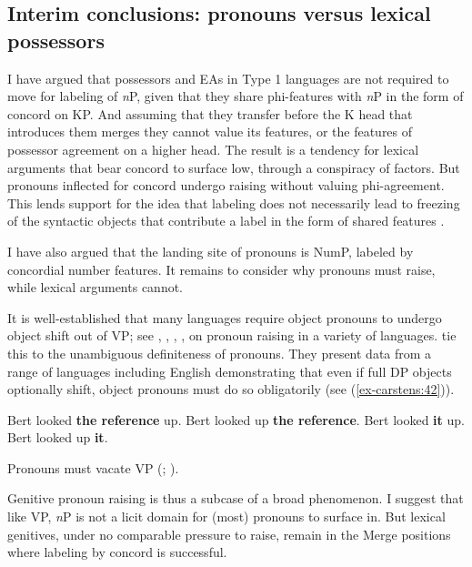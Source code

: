 \documentclass[output=paper
,modfonts
,nonflat]{langsci/langscibook}
\begin{document}
\subsection{Interim conclusions: pronouns versus lexical possessors} \label{sec-carstens:5.4}
I have argued that possessors and EAs in Type 1 languages are not required to move for labeling of \textit{n}P, given that they share phi-features with \textit{n}P in the form of concord on KP. And assuming that they transfer before the K head that introduces them merges they cannot value its features, or the features of possessor agreement on a higher head. The result is a tendency for lexical arguments that bear concord to surface low, through a conspiracy of factors. But pronouns inflected for concord undergo raising without valuing phi-agreement. This lends support for the idea that labeling does not necessarily lead to freezing of the syntactic objects that contribute a label in the form of shared features \citep{Chomsky2015}. 

I have also argued that the landing site of pronouns is NumP, labeled by concordial number features. It remains to consider why pronouns must raise, while lexical arguments cannot. 

It is well-established that many languages require object pronouns to undergo object shift out of VP; see \citet{Diesing1992, Diesing1997}, \citet{Diesing_Jelinek1995}, \citet{Roberts_Shlonsky1996}, \citet{Cardinaletti_Starke1999}, \citet{Holmberg1999} on pronoun raising in a variety of languages.  \citet{Diesing_Jelinek1995} tie this to the unambiguous definiteness of pronouns. They present data from a range of languages including English demonstrating that even if full DP objects optionally shift, object pronouns must do so obligatorily (see (\ref{ex-carstens:42})). 

\begin{exe}
\ex\label{ex-carstens:42} \xlist
\ex Bert looked \textbf{the reference} up.
\ex Bert looked up \textbf{the reference}.
\ex Bert looked \textbf{it} up.
\ex *Bert looked up \textbf{it}.
\endxlist
\end{exe}
\begin{exe} 
\ex Pronouns must vacate VP (\citealt{Diesing1992, Diesing1997}; \citealt{Diesing_Jelinek1995}).
\end{exe}
Genitive pronoun raising is thus a subcase of a broad phenomenon. I suggest that like VP, \textit{n}P is not a licit domain for (most) pronouns to surface in. But lexical genitives, under no comparable pressure to raise, remain in the Merge positions where labeling by concord is successful. 
\end{document}

